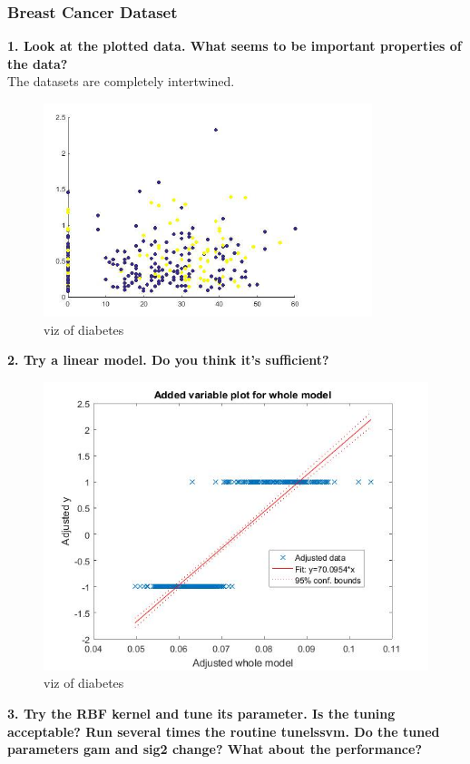 \documentclass[11pt,oneside,a4paper]{article}
\begin{document}
\subsubsection{Breast Cancer Dataset}

\textbf{1. Look at the plotted data. What seems to be important properties of the data?}\\

The datasets are completely intertwined.

\begin{figure}[H]
	\centering
	\includegraphics[scale=0.4]{../Figures/diabetes_viz}
	\caption{viz of diabetes }
\end{figure}
\textbf{2. Try a linear model. Do you think it’s sufficient?}\\
\begin{figure}[H]
	\centering
	\includegraphics[scale=0.4]{../Figures/diabetes_linear}
	\caption{viz of diabetes }
\end{figure}
\textbf{3. Try the RBF kernel and tune its parameter. Is the tuning acceptable? Run several times the routine tunelssvm. Do the tuned parameters gam and sig2 change? What about the performance?}\\
\end{document}
